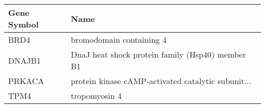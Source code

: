 \begin{tabular}{ll}
\toprule
Gene Symbol &                                               Name \\
\midrule
       BRD4 &                           bromodomain containing 4 \\
     DNAJB1 &   DnaJ heat shock protein family (Hsp40) member B1 \\
     PRKACA & protein kinase cAMP-activated catalytic subunit... \\
       TPM4 &                                      tropomyosin 4 \\
\bottomrule
\end{tabular}
